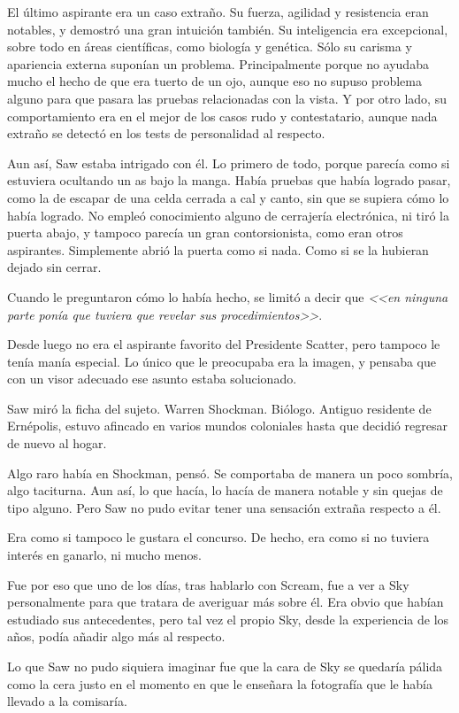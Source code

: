 El último aspirante era un caso extraño. Su fuerza, agilidad y resistencia eran notables, y demostró una gran intuición también. Su inteligencia era excepcional, sobre todo en áreas científicas, como biología y genética. Sólo su carisma y apariencia externa suponían un problema. Principalmente porque no ayudaba mucho el hecho de que era tuerto de un ojo, aunque eso no supuso problema alguno para que pasara las pruebas relacionadas con la vista. Y por otro lado, su comportamiento era en el mejor de los casos rudo y contestatario, aunque nada extraño se detectó en los tests de personalidad al respecto.

Aun así, Saw estaba intrigado con él. Lo primero de todo, porque parecía como si estuviera ocultando un as bajo la manga. Había pruebas que había logrado pasar, como la de escapar de una celda cerrada a cal y canto, sin que se supiera cómo lo había logrado. No empleó conocimiento alguno de cerrajería electrónica, ni tiró la puerta abajo, y tampoco parecía un gran contorsionista, como eran otros aspirantes. Simplemente abrió la puerta como si nada. Como si se la hubieran dejado sin cerrar.

Cuando le preguntaron cómo lo había hecho, se limitó a decir que \emph{<<en ninguna parte ponía que tuviera que revelar sus procedimientos>>}.

Desde luego no era el aspirante favorito del Presidente Scatter, pero tampoco le tenía manía especial. Lo único que le preocupaba era la imagen, y pensaba que con un visor adecuado ese asunto estaba solucionado.

Saw miró la ficha del sujeto. Warren Shockman. Biólogo. Antiguo residente de Ernépolis, estuvo afincado en varios mundos coloniales hasta que decidió regresar de nuevo al hogar.

Algo raro había en Shockman, pensó. Se comportaba de manera un poco sombría, algo taciturna. Aun así, lo que hacía, lo hacía de manera notable y sin quejas de tipo alguno. Pero Saw no pudo evitar tener una sensación extraña respecto a él.

Era como si tampoco le gustara el concurso. De hecho, era como si no tuviera interés en ganarlo, ni mucho menos.

Fue por eso que uno de los días, tras hablarlo con Scream, fue a ver a Sky personalmente para que tratara de averiguar más sobre él. Era obvio que habían estudiado sus antecedentes, pero tal vez el propio Sky, desde la experiencia de los años, podía añadir algo más al respecto.

Lo que Saw no pudo siquiera imaginar fue que la cara de Sky se quedaría pálida como la cera justo en el momento en que le enseñara la fotografía que le había llevado a la comisaría.

